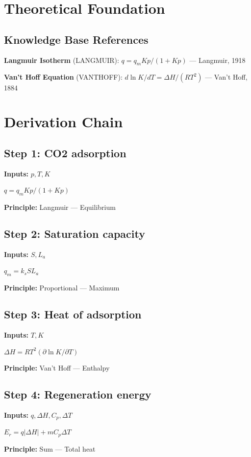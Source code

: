 \documentclass[11pt,twocolumn]{article}
\begin{document}
\section{Theoretical Foundation}

\subsection{Knowledge Base References}
\textbf{Langmuir Isotherm} (LANGMUIR): $q = q_m K p / (1 + K p)$ --- Langmuir, 1918

\textbf{Van't Hoff Equation} (VANTHOFF): $d\ln K/dT = \Delta H/(RT^2)$ --- Van't Hoff, 1884


\section{Derivation Chain}

\subsection*{Step 1: CO2 adsorption}
\textbf{Inputs:} $p, T, K$

$q = q_m K p / (1 + K p)$

\textbf{Principle:} Langmuir --- Equilibrium

\subsection*{Step 2: Saturation capacity}
\textbf{Inputs:} $S, L_a$

$q_m = k_s S L_a$

\textbf{Principle:} Proportional --- Maximum

\subsection*{Step 3: Heat of adsorption}
\textbf{Inputs:} $T, K$

$\Delta H = R T^2 (\partial \ln K / \partial T)$

\textbf{Principle:} Van't Hoff --- Enthalpy

\subsection*{Step 4: Regeneration energy}
\textbf{Inputs:} $q, \Delta H, C_p, \Delta T$

$E_r = q|\Delta H| + m C_p \Delta T$

\textbf{Principle:} Sum --- Total heat
\end{document}
